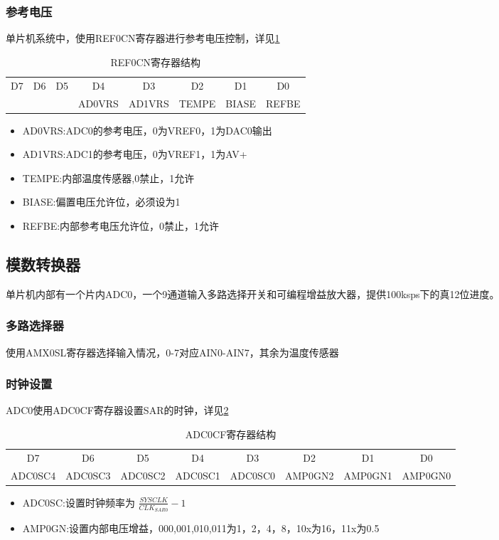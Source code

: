 \documentclass{article}
\begin{document}
\begin{CJK}{UTF8}{gkai}
\subsubsection{参考电压}
单片机系统中，使用REF0CN寄存器进行参考电压控制，详见\ref{table_REF0CN}
\begin{table}[!htbp]
  \caption{REF0CN寄存器结构}
  \label{table_REF0CN}
  \begin{tabular}{|c|c|c|c|c|c|c|c|}
    \hline
    D7&D6&D5&D4&D3&D2&D1&D0\\
    &&&AD0VRS&AD1VRS&TEMPE&BIASE&REFBE\\
    \hline
  \end{tabular}
\end{table}
\begin{itemize}
  \item AD0VRS:ADC0的参考电压，0为VREF0，1为DAC0输出
  \item AD1VRS:ADC1的参考电压，0为VREF1，1为AV+
  \item TEMPE:内部温度传感器,0禁止，1允许
  \item BIASE:偏置电压允许位，必须设为1
  \item REFBE:内部参考电压允许位，0禁止，1允许
\end{itemize}
\subsection{模数转换器}
单片机内部有一个片内ADC0，一个9通道输入多路选择开关和可编程增益放大器，提供100ksps下的真12位进度。
\subsubsection{多路选择器}
使用AMX0SL寄存器选择输入情况，0-7对应AIN0-AIN7，其余为温度传感器
\subsubsection{时钟设置}
ADC0使用ADC0CF寄存器设置SAR的时钟，详见\ref{table_ADC0CF}
\begin{table}[!htbp]
  \caption{ADC0CF寄存器结构}
  \label{table_ADC0CF}
  \begin{tabular}{|c|c|c|c|c|c|c|c|}
    \hline
    D7&D6&D5&D4&D3&D2&D1&D0\\
    ADC0SC4&ADC0SC3&ADC0SC2&ADC0SC1&ADC0SC0&AMP0GN2&AMP0GN1&AMP0GN0\\
    \hline
  \end{tabular}
\end{table}
\begin{itemize}
  \item ADC0SC:设置时钟频率为 $\frac{SYSCLK}{CLK_{SAR0}}-1$
  \item AMP0GN:设置内部电压增益，000,001,010,011为1，2，4，8，10x为16，11x为0.5
\end{itemize}

\end{CJK}
\end{document}
